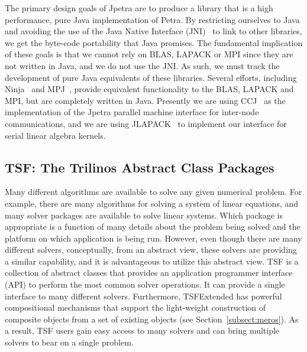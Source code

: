 \documentclass[12pt,relax]{TPA}
\begin{document}
The primary design goals of Jpetra are to produce a library that 
is a high performance, pure Java implementation of Petra.  By restricting 
ourselves to Java and avoiding the use of the Java Native Interface 
(JNI)~\cite{JNI-site} to link to other libraries, we get the byte-code 
portability that Java promises.  The fundamental implication of these 
goals is that we cannot rely on BLAS, 
LAPACK or MPI since they are not written in 
Java, and we do not use the JNI.  As such, we must track the development 
of pure Java equivalents of these libraries.  Several efforts, including 
Ninja~\cite{MoreMidkGuptArtiWuAlma2001} and 
MPJ~\cite{CarpGetoJuddSkjeFox2000}, provide equivalent functionality 
to the BLAS, LAPACK and MPI, but are completely written in Java.
Presently we are using CCJ~\cite{CCJ} as the implementation of the
Jpetra parallel machine interface for inter-node communications, and we are using
JLAPACK~\cite{JLAPACK} to implement our interface for serial linear algebra kernels.

\subsection{TSF: The Trilinos Abstract Class Packages}

Many different algorithms are available to solve any given numerical
problem.  For example, there are many algorithms for solving a system
of linear equations, and many solver packages are available to solve
linear systems.  Which package is appropriate is a function of
many details about the problem being solved and the platform on which
application is being run. However, even though
there are many different solvers, conceptually, from an abstract view,
these solvers are providing a similar capability, and it is
advantageous to utilize this abstract view.
TSF is a collection of abstract classes that provides an application
programmer interface (API) to perform the most common solver
operations.  It can provide a single interface to many different
solvers.  Furthermore, TSFExtended has powerful compositional
mechanisms that support the
light-weight construction of composite objects from a set of
existing objects (see Section~\ref{subsect:meros}).
As a result, TSF users gain easy access to many
solvers and can bring multiple solvers to bear on a single problem.
\end{document}
